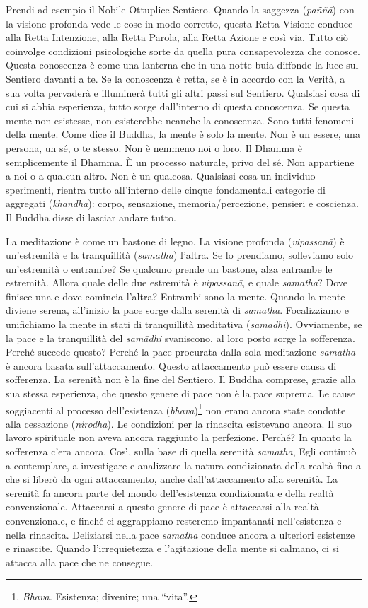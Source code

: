 Prendi ad esempio il Nobile Ottuplice Sentiero. Quando la saggezza
(\emph{paññā}) con la visione profonda vede le cose in modo corretto,
questa Retta Visione conduce alla Retta Intenzione, alla Retta Parola,
alla Retta Azione e così via. Tutto ciò coinvolge condizioni
psicologiche sorte da quella pura consapevolezza che conosce. Questa
conoscenza è come una lanterna che in una notte buia diffonde la luce
sul Sentiero davanti a te. Se la conoscenza è retta, se è in accordo con
la Verità, a sua volta pervaderà e illuminerà tutti gli altri passi sul
Sentiero. Qualsiasi cosa di cui si abbia esperienza, tutto sorge
dall'interno di questa conoscenza. Se questa mente non esistesse, non
esisterebbe neanche la conoscenza. Sono tutti fenomeni della mente. Come
dice il Buddha, la mente è solo la mente. Non è un essere, una persona,
un sé, o te stesso. Non è nemmeno noi o loro. Il Dhamma è semplicemente
il Dhamma. È un processo naturale, privo del sé. Non appartiene a noi o
a qualcun altro. Non è un qualcosa. Qualsiasi cosa un individuo
sperimenti, rientra tutto all'interno delle cinque fondamentali
categorie di aggregati (\emph{khandhā}): corpo, sensazione,
memoria/percezione, pensieri e coscienza. Il Buddha disse di lasciar
andare tutto.

La meditazione è come un bastone di legno. La visione profonda
(\emph{vipassanā}) è un'estremità e la tranquillità (\emph{samatha})
l'altra. Se lo prendiamo, solleviamo solo un'estremità o entrambe? Se
qualcuno prende un bastone, alza entrambe le estremità. Allora quale
delle due estremità è \emph{vipassanā}, e quale \emph{samatha}? Dove
finisce una e dove comincia l'altra? Entrambi sono la mente. Quando la
mente diviene serena, all'inizio la pace sorge dalla serenità di
\emph{samatha}. Focalizziamo e unifichiamo la mente in stati di
tranquillità meditativa (\emph{samādhi}). Ovviamente, se la pace e la
tranquillità del \emph{samādhi} svaniscono, al loro posto sorge la
sofferenza. Perché succede questo? Perché la pace procurata dalla sola
meditazione \emph{samatha} è ancora basata sull'attaccamento. Questo
attaccamento può essere causa di sofferenza. La serenità non è la fine
del Sentiero. Il Buddha comprese, grazie alla sua stessa esperienza, che
questo genere di pace non è la pace suprema. Le cause soggiacenti al
processo dell'esistenza (\emph{bhava})\footnote{\emph{Bhava.} Esistenza;
  divenire; una ``vita''.} non erano ancora state condotte alla
cessazione (\emph{nirodha}). Le condizioni per la rinascita esistevano
ancora. Il suo lavoro spirituale non aveva ancora raggiunto la
perfezione. Perché? In quanto la sofferenza c'era ancora. Così, sulla
base di quella serenità \emph{samatha}, Egli continuò a contemplare, a
investigare e analizzare la natura condizionata della realtà fino a che
si liberò da ogni attaccamento, anche dall'attaccamento alla serenità.
La serenità fa ancora parte del mondo dell'esistenza condizionata e
della realtà convenzionale. Attaccarsi a questo genere di pace è
attaccarsi alla realtà convenzionale, e finché ci aggrappiamo resteremo
impantanati nell'esistenza e nella rinascita. Deliziarsi nella pace
\emph{samatha} conduce ancora a ulteriori esistenze e rinascite. Quando
l'irrequietezza e l'agitazione della mente si calmano, ci si attacca
alla pace che ne consegue.


